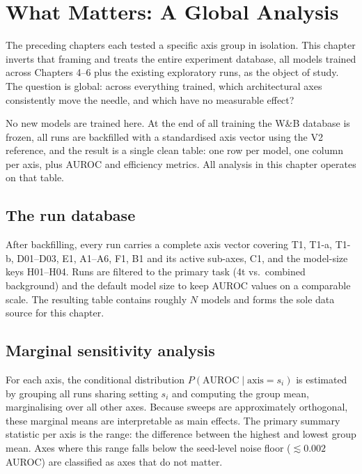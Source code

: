 \chapter{What Matters: A Global Analysis}

The preceding chapters each tested a specific axis group in isolation.
This chapter inverts that framing and treats the entire experiment
database, all models trained across Chapters 4--6 plus the existing
exploratory runs, as the object of study. The question is global:
across everything trained, which architectural axes consistently move
the needle, and which have no measurable effect?

No new models are trained here. At the end of all training the W\&B
database is frozen, all runs are backfilled with a standardised axis
vector using the V2 reference, and the result is a single clean table:
one row per model, one column per axis, plus AUROC and efficiency
metrics. All analysis in this chapter operates on that table.

\section{The run database}

After backfilling, every run carries a complete axis vector covering
T1, T1-a, T1-b, D01--D03, E1, A1--A6, F1, B1 and its active
sub-axes, C1, and the model-size keys H01--H04. Runs are filtered to
the primary task (4t vs.\ combined background) and the default model
size to keep AUROC values on a comparable scale. The resulting table
contains roughly $N$ models and forms the sole data source for this
chapter.

\section{Marginal sensitivity analysis}

For each axis, the conditional distribution $P(\text{AUROC} \mid
\text{axis} = s_i)$ is estimated by grouping all runs sharing setting
$s_i$ and computing the group mean, marginalising over all other axes.
Because sweeps are approximately orthogonal, these marginal means are
interpretable as main effects. The primary summary statistic per axis
is the range: the difference between the highest and lowest group mean.
Axes where this range falls below the seed-level noise floor
($\lesssim 0.002$ AUROC) are classified as axes that do not matter.


